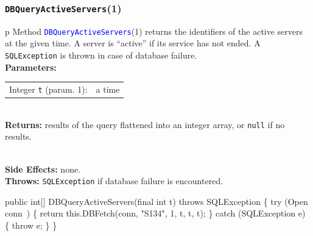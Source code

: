 \documentclass{article}
\def\nwendcode{\endtrivlist \endgroup}      %
\let\nwdocspar=\par
\theoremstyle{definition}                   %
\begin{document}
\subsubsection{{\tt{}\protect{}DBQueryActiveServers}(1)}
\begin{tabular}{p{\textwidth}}
\toprule
{}
Method \textcolor{blue}{{\tt{}\protect{}DBQueryActiveServers}}(1) returns the identifiers
of the active servers at the given time. A server is ``active'' if its
service has not ended.
A {\tt{}SQLException} is thrown in case of database failure.\\
\midrule
\textbf{Parameters:} \\
\begin{tabular}{lp{116mm}}
Integer {\tt{}t} (param. 1):&a time
\end{tabular}\\
\textbf{Returns:} results of the query flattened into an integer array, or
{\tt{}null} if no results.

\\
\textbf{Side Effects:} none.\\
\textbf{Throws:} {\tt{}SQLException} if database failure is encountered.\\
\bottomrule
\end{tabular}
\nwenddocs{}\endmoddef{}
public int[] DBQueryActiveServers(final int t) throws SQLException \{
  try (\LA{}Open \code{}conn\edoc{}~{\nwtagstyle{}}\RA{}) \{
    return this.DBFetch(conn, "S134", 1, t, t, t);
  \} catch (SQLException e) \{
    throw e;
  \}
\}
\eatline
{}\nwendcode{}\nwdocspar
\end{document}
